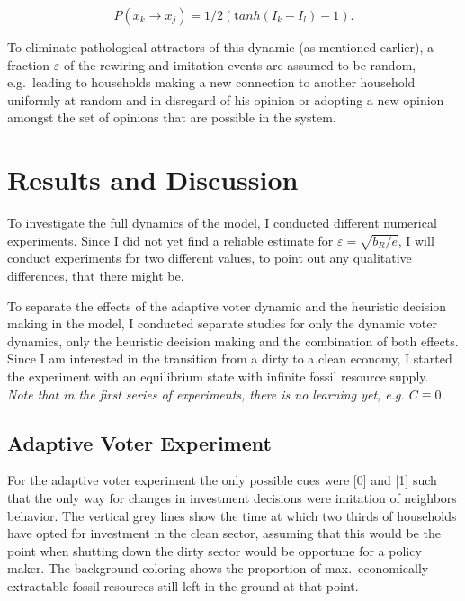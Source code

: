 \begin{equation} 
	P(x_k \rightarrow x_j) = 1/2 ({\mathrm tanh}(I_k - I_l)-1).
	\label{primitive_imitation_probability}
\end{equation}

To eliminate pathological attractors of this dynamic (as mentioned earlier), a fraction $\varepsilon$ of the rewiring and imitation events are assumed to be random, e.g.\ leading to households making a new connection to another household uniformly at random and in disregard of his opinion or adopting a new opinion amongst the set of opinions that are possible in the system.
\newpage


\section{Results and Discussion}  

To investigate the full dynamics of the model, I conducted different numerical experiments. Since I did not yet find a reliable estimate for $\varepsilon = \sqrt{b_R/e}$, I will conduct experiments for two different values, to point out any qualitative differences, that there might be.

To separate the effects of the adaptive voter dynamic and the heuristic decision making in the model, I conducted separate studies for only the dynamic voter dynamics, only the heuristic decision making and the combination of both effects. \\
Since I am interested in the transition from a dirty to a clean economy, I started the experiment with an equilibrium state with infinite fossil resource supply.\\

\textit{Note that in the first series of experiments, there is no learning yet, e.g. $C \equiv 0$.}

\subsection{Adaptive Voter Experiment}
For the adaptive voter experiment the only possible cues were [0] and [1] such that the only way for changes in investment decisions were imitation of neighbors behavior.
The vertical grey lines show the time at which two thirds of households have opted for investment in the clean sector, assuming that this would be the point when shutting down the dirty sector would be opportune for a policy maker. The background coloring shows the proportion of max.\ economically extractable fossil resources still left in the ground at that point.
